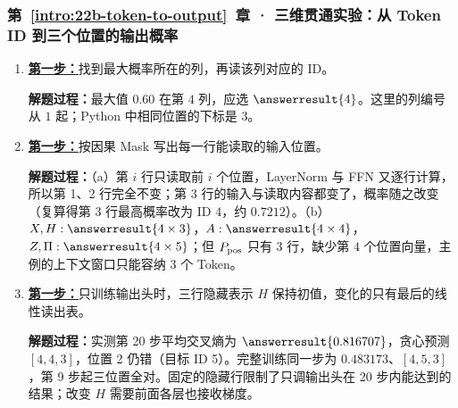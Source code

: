 \subsubsection*{第~\ref*{intro:22b-token-to-output}~章 · 三维贯通实验：从 Token ID 到三个位置的输出概率}
\begin{enumerate}[label={},leftmargin=4.8em,itemsep=4pt]
\item[\textbf{C-072.}] \leavevmode{}\label{solution:C-072}\label{solution:probability-row-greedy}\hyperref[exercise:probability-row-greedy]{\textbf{第一步：}}找到最大概率所在的列，再读该列对应的 ID。\par\nobreak
\textbf{解题过程：}最大值 $0.60$ 在第 $4$ 列，应选 $\answerresult{4}$。这里的列编号从 $1$ 起；Python 中相同位置的下标是 $3$。
\item[\textbf{C-073.}] \leavevmode{}\label{solution:C-073}\label{solution:causal-input-change}\hyperref[exercise:causal-input-change]{\textbf{第一步：}}按因果 Mask 写出每一行能读取的输入位置。\par\nobreak\textbf{解题过程：}（a）第 $i$ 行只读取前 $i$ 个位置，LayerNorm 与 FFN 又逐行计算，所以第 1、2 行完全不变；第 3 行的输入与读取内容都变了，概率随之改变（复算得第 3 行最高概率改为 ID 4，约 $0.7212$）。（b）$X,H:\answerresult{4\times3}$，$A:\answerresult{4\times4}$，$Z,\Pi:\answerresult{4\times5}$；但 $P_{\rm pos}$ 只有 $3$ 行，缺少第 $4$ 个位置向量，主例的上下文窗口只能容纳 $3$ 个 Token。
\item[\textbf{C-074.}] \leavevmode{}\label{solution:C-074}\label{solution:output-head-only-training}\hyperref[exercise:output-head-only-training]{\textbf{第一步：}}只训练输出头时，三行隐藏表示 $H$ 保持初值，变化的只有最后的线性读出表。\par\nobreak
\textbf{解题过程：}实测第 20 步平均交叉熵为 $\answerresult{0.816707}$，贪心预测 $[4,4,3]$，位置 2 仍错（目标 ID 5）。完整训练同一步为 $0.483173$、$[4,5,3]$，第 9 步起三位置全对。固定的隐藏行限制了只调输出头在 20 步内能达到的结果；改变 $H$ 需要前面各层也接收梯度。
\end{enumerate}
